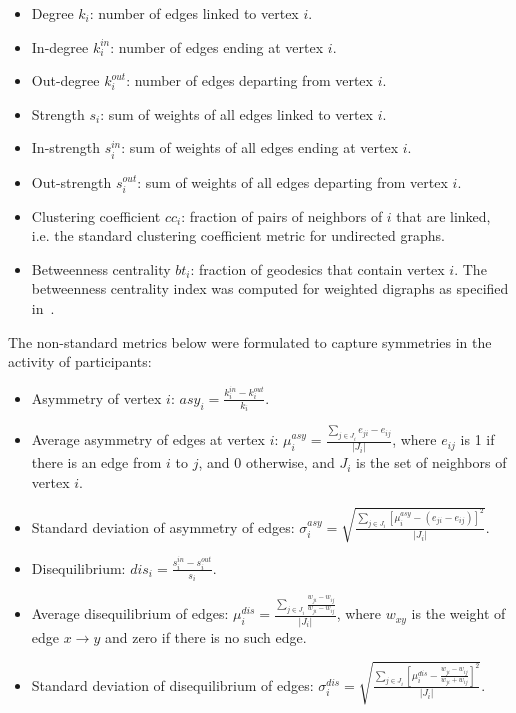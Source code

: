 \documentclass[%
aip,
jmp,%
amsmath,amssymb,
reprint,%
]{revtex4-1}
\begin{document}
\begin{itemize}
\item Degree     $k_i$: number of edges linked to vertex $i$.
\item In-degree  $k_i^{in}$: number of edges ending at vertex $i$.
\item Out-degree $k_i^{out}$: number of edges departing from vertex $i$.
\item Strength $s_i$: sum of weights of all edges linked to vertex $i$.
\item In-strength $s_i^{in}$: sum of weights of all edges ending at vertex $i$.
\item Out-strength $s_i^{out}$: sum of weights of all edges departing from vertex $i$.
\item Clustering coefficient $cc_i$: fraction of pairs of neighbors of $i$ that are linked, i.e. the standard clustering coefficient metric for undirected graphs.
\item Betweenness centrality $bt_i$: fraction of geodesics that contain vertex $i$. The betweenness centrality index was computed for weighted digraphs as specified in~\cite{faster}.
\end{itemize}

The non-standard metrics below were formulated to capture symmetries in the activity of participants:

\begin{itemize}
\item Asymmetry of vertex $i$: $asy_i=\frac{k_i^{in}-k_i^{out}}{k_i}$.
\item Average asymmetry of edges at vertex $i$: $\mu_i^{asy}=\frac{\sum_{j\in J_i} e_{ji}-e_{ij}}{|J_i|}$, where $e_{ij}$ is 1 if there is an edge from $i$ to $j$, and $0$ otherwise, and $J_i$ is the set of neighbors of vertex $i$.
\item Standard deviation of asymmetry of edges: $\sigma_i^{asy}=\sqrt{\frac{\sum_{j\in J_i}[\mu^{asy}_i -(e_{ji}-e_{ij}) ]^2  }{|J_i|}  }$.
\item Disequilibrium: $dis_i=\frac{s_i^{in}-s_i^{out}}{s_i}$.
\item Average disequilibrium of edges: $\mu_i^{dis}=\frac{\sum_{j \in J_i}\frac{w_{ji}-w_{ij}}{w_{ji}-w_{ij}}}{|J_i|}$, where $w_{xy}$ is the weight of edge $x\rightarrow y$ and zero if there is no such edge.
\item Standard deviation of disequilibrium of edges: $\sigma_i^{dis}=\sqrt{\frac{\sum_{j\in J_i}\left[\mu^{dis}_i-\frac{w_{ji}-w_{ij}}{w_{ji}+w_{ij}}\right]^2}{|J_i|}}$.
\end{itemize}
\end{document}
